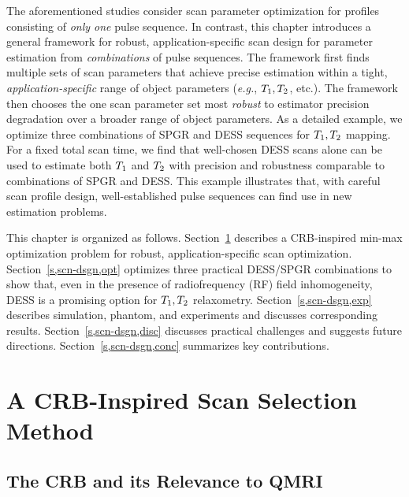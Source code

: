 The aforementioned studies consider scan parameter optimization 
for profiles consisting of \emph{only one} pulse sequence.
In contrast, this chapter introduces a general framework 
for robust, application-specific scan design 
for parameter estimation from \emph{combinations} of pulse sequences.
The framework first finds multiple sets of scan parameters 
that achieve precise estimation 
within a tight, \emph{application-specific} range 
of object parameters (\emph{e.g.}, $T_1, T_2$, etc.).
The framework then chooses the one scan parameter set 
most \emph{robust} to estimator precision degradation 
over a broader range of object parameters.
As a detailed example, 
we optimize three combinations of SPGR and DESS sequences 
for $T_1, T_2$ mapping. 
For a fixed total scan time, 
we find that well-chosen DESS scans alone 
can be used to estimate both $T_1$ and $T_2$ 
with precision and robustness comparable 
to combinations of SPGR and DESS. 
This example illustrates that, 
with careful scan profile design, 
well-established pulse sequences 
can find use in new estimation problems.

This chapter is organized as follows. 
Section~\ref{s,scn-dsgn,crb} describes 
a CRB-inspired min-max optimization problem 
for robust, application-specific scan optimization. 
Section~\ref{s,scn-dsgn,opt} optimizes 
three practical DESS/SPGR combinations 
to show that, 
even in the presence of radiofrequency (RF) field inhomogeneity, 
DESS is a promising option for $T_1, T_2$ relaxometry.  
Section~\ref{s,scn-dsgn,exp} describes 
simulation, phantom, and \invivo experiments 
and discusses corresponding results.
Section~\ref{s,scn-dsgn,disc} discusses practical challenges 
and suggests future directions.
Section~\ref{s,scn-dsgn,conc} summarizes key contributions.

\section{A CRB-Inspired Scan Selection Method}
\label{s,scn-dsgn,crb}

\subsection{The CRB and its Relevance to QMRI}
\label{ss,scn-dsgn,crb,sig}

